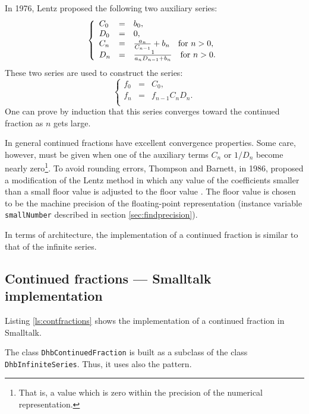 \documentclass[twoside]{book}
\begin{document}
In 1976, Lentz proposed the following two auxiliary series:
\begin{equation}
  \left\{{
  \begin{array}{lcl}
    C_0 & = & b_0,\\
    D_0 & = & 0, \\
    C_n & = & {a_n \over C_{n-1}}+b_n\mbox{\quad for $n>0$}, \\
    D_n & = & {1 \over a_n D_{n-1}+b_n}\mbox{\quad for $n>0$}.
  \end{array}
  }\right.
\end{equation}
These two series are used to construct the series:
\begin{equation}
  \left\{{
  \begin{array}{lcl}
    f_0 & = & C_0,\\
    f_n & = & f_{n-1}C_n D_n. \\
  \end{array}
  }\right.
\end{equation}
One can prove by induction that this series converges toward the
continued fraction as $n$ gets large.

In general continued fractions have excellent convergence
properties. Some care, however, must be given when one of the
auxiliary terms $C_n$ or $1/D_n$ become nearly zero\footnote{That
is, a value which is zero within the precision of the numerical
representation.}. To avoid rounding errors, Thompson and Barnett,
in 1986, proposed a modification of the Lentz method in which any
value of the coefficients smaller than a small floor value is
adjusted to the floor value \cite{Press}. The floor value is
chosen to be the machine precision of the floating-point
representation (instance variable {\tt smallNumber} described in
section \ref{sec:findprecision}).

In terms of architecture, the implementation of a continued
fraction is similar to that of the infinite series.

\subsection{Continued fractions --- Smalltalk  implementation}
 Listing \ref{ls:contfractions} shows
the implementation of a continued fraction in Smalltalk.

The class {\tt DhbContinuedFraction} is built as a subclass of the
class {\tt DhbInfiniteSeries}. Thus, it uses also the
 pattern.
\end{document}
